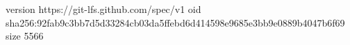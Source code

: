version https://git-lfs.github.com/spec/v1
oid sha256:92fab9c3bb7d5d33284cb03da5ffebd6d414598e9685e3bb9e0889b4047b6f69
size 5566
